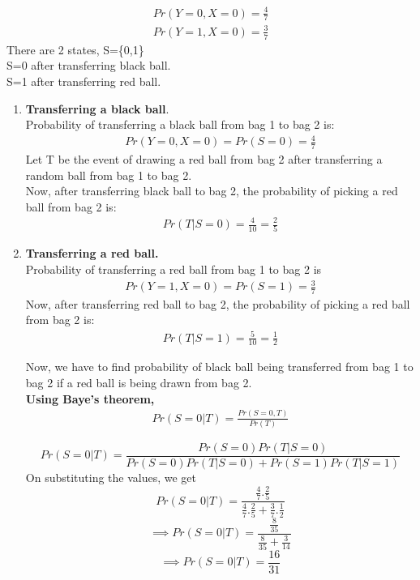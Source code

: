 \documentclass[journal,12pt,twocolumn]{IEEEtran}
\begin{document}
\begin{align}
    Pr(Y=0,X=0)=\frac{4}{7}\\
    Pr(Y=1,X=0)=\frac{3}{7}
\end{align}
There are 2 states,
S=\{0,1\}\\
S=0 after transferring black ball.\\
S=1 after transferring red ball.\\
\begin{enumerate}
    \item \textbf{Transferring a black ball}.\\
    
Probability of transferring a black ball from bag 1 to bag 2 is:
\begin{align}
    Pr(Y=0,X=0)=Pr(S=0)=\frac{4}{7}
\end{align}
Let T be the event of drawing a red ball from bag 2 after transferring a random ball from bag 1 to bag 2.\\
Now, after transferring black ball to bag 2, the probability of picking a red ball from bag 2 is:
\begin{align}
    Pr(T|S=0)=\frac{4}{10}=\frac{2}{5}
\end{align}

\item \textbf{Transferring a red ball.}\\

Probability of transferring a red ball from bag 1 to bag 2 is
\begin{align}
    Pr(Y=1,X=0)=Pr(S=1)=\frac{3}{7}
\end{align}
Now, after transferring red ball to bag 2, the probability of picking a red ball from bag 2 is:
\begin{align}
    Pr(T|S=1)=\frac{5}{10}=\frac{1}{2}
\end{align}

Now, we have to find probability of black ball being transferred from bag 1 to bag 2 if a red ball is being drawn from bag 2.\\

\textbf{Using Baye's theorem,}
\begin{align}
    Pr(S=0|T)=\frac{Pr(S=0,T)}{Pr(T)}
\end{align}

{\tiny \[Pr(S=0|T)=\frac{Pr(S=0)Pr(T|S=0)}{Pr(S=0)Pr(T|S=0)+Pr(S=1)Pr(T|S=1)}\]}
On substituting the values, we get
\[Pr(S=0|T)=\frac{\frac{4}{7}.\frac{2}{5}}{\frac{4}{7}.\frac{2}{5}+\frac{3}{7}.\frac{1}{2}}\]
\[\implies Pr(S=0|T)  =\frac{\frac{8}{35}}{\frac{8}{35}+\frac{3}{14}}\]
\[\implies  Pr(S=0|T)=\frac{16}{31}\]

\end{enumerate}
\end{document}
